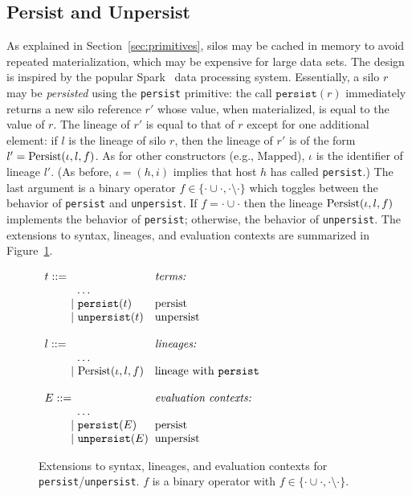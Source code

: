 \subsection{Persist and Unpersist}\label{sec:persist}

As explained in Section~\ref{sec:primitives}, silos may be cached in
memory to avoid repeated materialization, which may be expensive for
large data sets. The design is inspired by the popular
Spark~\cite{Spark} data processing system. Essentially, a silo $r$ may
be {\em persisted} using the \verb|persist| primitive: the call
$\texttt{persist}(r)$ immediately returns a new silo reference $r'$
whose value, when materialized, is equal to the value of $r$.  The
lineage of $r'$ is equal to that of $r$ except for one additional
element: if $l$ is the lineage of silo $r$, then the lineage of $r'$
is of the form $l' = {\textrm{Persist}(\iota, l, f)}$. As for other constructors
(e.g., $\text{Mapped}$), $\iota$ is the identifier of lineage $l'$.
(As before, $\iota = (h, i)$ implies that host $h$ has called
\verb|persist|.)  The last argument is a binary operator $f \in \{
\cdot\cup\cdot, \cdot\setminus\cdot \}$ which toggles between the
behavior of \verb|persist| and \verb|unpersist|. If $f =
\cdot\cup\cdot$ then the lineage ${\textrm{Persist}(\iota, l, f)}$ implements the
behavior of \verb|persist|; otherwise, the behavior of
\verb|unpersist|. The extensions to syntax, lineages, and evaluation
contexts are summarized in Figure~\ref{fig:persist-syntax}.

\begin{figure}
\centering
$\ba[t]{l@{\hspace{2mm}}l}
t ::=                                     & \mbox{{\it terms:}} \\
\gap \:\:\:\: \ldots                      & \mbox{} \\
\gap ~|~ \texttt{persist}(t)              & \mbox{persist} \\
\gap ~|~ \texttt{unpersist}(t)            & \mbox{unpersist} \\
& \\
l ::=                                    & \mbox{{\it{lineages:}}} \\
\gap \:\:\:\: \ldots                     & \mbox{} \\
\gap ~|~  \text{Persist}(\iota, l, f)    & \mbox{lineage with \texttt{persist}} \\
& \\
E ::=                             & \mbox{\it{evaluation contexts:}} \\
\gap \:\:\:\: \ldots              & \mbox{} \\
\gap ~|~  \texttt{persist}(E)     & \mbox{persist} \\
\gap ~|~  \texttt{unpersist}(E)   & \mbox{unpersist} \\
\ea$
\caption{Extensions to syntax, lineages, and evaluation contexts for
  \texttt{persist}/\texttt{unpersist}. $f$ is a binary operator with
  $f \in \{\cdot\cup\cdot,
  \cdot\setminus\cdot\}$.}\label{fig:persist-syntax}
\end{figure}

